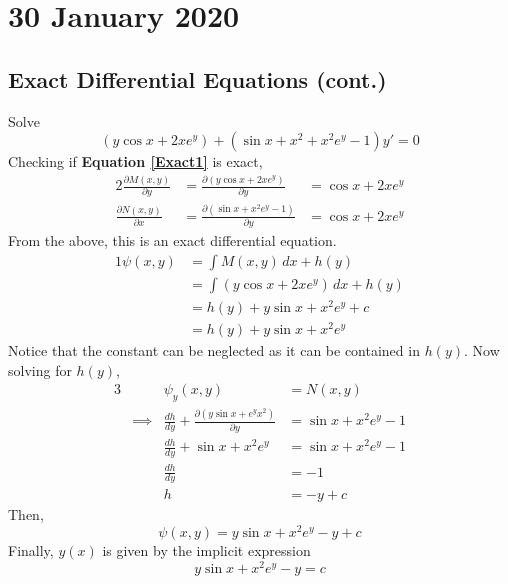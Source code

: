 \documentclass[diffeq.tex]{subfiles}
\begin{document}
\chapter{30 January 2020}
    \section{Exact Differential Equations (cont.)}
    \begin{example}
        Solve
        \begin{equation}
            \label{Exact1}
            (y\cos x + 2xe^{y}) + (\sin x + x^{2} + x^{2}e^{y} - 1)y' = 0
        \end{equation}
        Checking if \textbf{Equation \ref{Exact1}} is exact,
        \begin{alignat}{2}
            \frac{\partial M(x, y)}{\partial y} &= \frac{\partial (y\cos x + 2xe^y)}{\partial y} &= \cos x + 2xe^y\\
            \frac{\partial N(x, y)}{\partial x} &= \frac{\partial (\sin x + x^{2}e^{y} - 1)}{\partial y} &= \cos x + 2xe^y
        \end{alignat}
        From the above, this is an exact differential equation.
        \begin{alignat}{1}
            \psi(x, y) &= \int M(x, y)\,dx + h(y)\\
            &= \int (y\cos x + 2xe^{y})\,dx + h(y)\\
            &= h(y) + y\sin x+ x^{2}e^{y} + c\\
            &= h(y) + y\sin x + x^{2}e^{y}
         \end{alignat}
         Notice that the constant can be neglected as it can be contained in $h(y)$. Now solving for $h(y)$,
         \begin{alignat}{3}
            &&\psi_{y}(x, y) &= N(x, y)\\
            &\implies&\frac{dh}{dy} + \frac{\partial(y\sin x + e^{y}x^{2})}{\partial y}&=\sin x + x^{2}e^{y} - 1\\
            &&\frac{dh}{dy} + \sin x + x^{2}e^{y}&=\sin x + x^{2}e^{y} - 1\\
            &&\frac{dh}{dy}&= -1\\
            &&h&=-y + c
         \end{alignat}
         Then,
         \begin{equation}
             \psi(x, y) = y\sin x + x^{2}e^{y} - y + c
         \end{equation}
         Finally, $y(x)$ is given by the implicit expression
         \begin{equation}
             y\sin x + x^{2}e^{y} - y = c
         \end{equation}
    \end{example}
\end{document}
